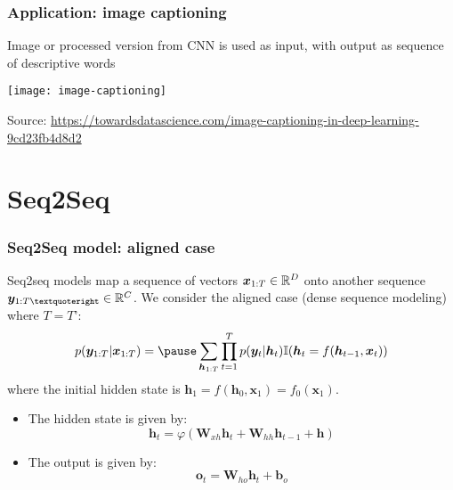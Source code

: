 \documentclass[smaller]{beamer}
\begin{document}
    \begin{frame}
    \frametitle{Application: image captioning}
    \pe
    Image or processed version from CNN is used as input, with output as sequence of descriptive words \pe
      \begin{center}
        \texttt{[image: image-captioning]}

        {\tiny Source: \url{https://towardsdatascience.com/image-captioning-in-deep-learning-9cd23fb4d8d2}}
      \end{center}
    \end{frame}
    
\section{Seq2Seq}
\begin{frame}
  \frametitle{Seq2Seq model: aligned case}\pe
  Seq2seq models map a sequence of vectors $\bm x_{1:T}\in\mathbb R^D$ onto another sequence $\bm y_{1:T’}\in \mb R^C$. \pe
  We consider the aligned case (dense sequence modeling) where $T = T’$:
  \begin{equation}
    p(\bm y_{1:T}|\bm x_{1:T}) = \pe\sum_{\bm h_{1:T}}\prod_{t=1}^Tp(\bm y_t|\bm h_t) \mb I(\bm h_t = f(\bm h_{t-1},\bm x_t))
  \end{equation}
  \pe where the initial hidden state is $\bm h_1 = f(\bm h_0,\bm x_1) = f_0(\bm x_1)$.\pe
  \begin{itemize}
  \item The hidden state is given by:\pe
    \begin{equation}
      \bm h_t  = \varphi(\bm W_{xh}\bm h_t + \bm W_{hh}\bm h_{t-1} + \bm h)
    \end{equation}
    \pe
  \item The output is given by:\pe
    \begin{equation}
      \bm o_t = \bm W_{ho}\bm h_t + \bm b_o
    \end{equation}
  \end{itemize}
\end{frame}
\end{document}
